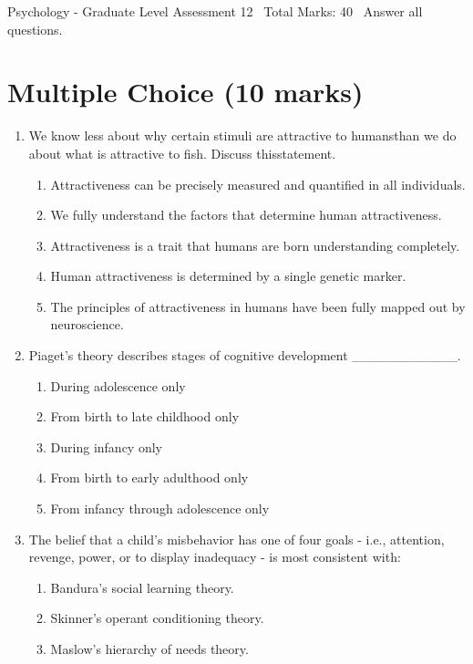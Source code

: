 \documentclass[12pt]{article}
\begin{document}
\begin{center}
Psychology - Graduate Level Assessment 12 \
Total Marks: 40 \
Answer all questions.
\end{center}

\section*{Multiple Choice (10 marks)}
\begin{enumerate}[label=\arabic*.]
\item We know less about why certain stimuli are attractive to humansthan we do about what is attractive to fish. Discuss thisstatement.
\begin{enumerate}[label=(\alph*)]
    \item Attractiveness can be precisely measured and quantified in all individuals.
    \item We fully understand the factors that determine human attractiveness.
    \item Attractiveness is a trait that humans are born understanding completely.
    \item Human attractiveness is determined by a single genetic marker.
    \item The principles of attractiveness in humans have been fully mapped out by neuroscience.
\end{enumerate}
\item Piaget's theory describes stages of cognitive development \_\_\_\_\_\_\_\_\_\_\_.
\begin{enumerate}[label=(\alph*)]
    \item During adolescence only
    \item From birth to late childhood only
    \item During infancy only
    \item From birth to early adulthood only
    \item From infancy through adolescence only
\end{enumerate}
\item The belief that a child's misbehavior has one of four goals - i.e., attention, revenge, power, or to display inadequacy - is most consistent with:
\begin{enumerate}[label=(\alph*)]
    \item Bandura's social learning theory.
    \item Skinner's operant conditioning theory.
    \item Maslow's hierarchy of needs theory.

\end{enumerate}
\end{enumerate}
\end{document}
